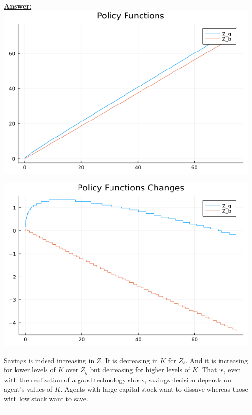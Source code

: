 \documentclass{article} %
\theoremstyle{definition}
\newenvironment{solution}[1][Answer]{\begin{singlespace}\underline{\textbf{#1:}}\quad }{\ \rule{0.3em}{0.3em}\end{singlespace}} %
\begin{document}
\begin{enumerate}
\begin{solution}
		\includegraphics[width=\linewidth]{02_Policy_Functions.png}
		
		\includegraphics[width=\linewidth]{02_Policy_Functions_Changes.png}
		
		Savings is indeed increasing in $ Z $. It is decreasing in $ K $ for $ Z_b $. And it is increasing for lower levels of $ K $ over $ Z_g $   but decreasing for higher levels of $ K $. That is, even with the realization of a good technology shock, savings decision depends on agent's values of $ K $. Agents with large capital stock want to dissave whereas those with low stock want to save.
	\end{solution}
\end{enumerate}
\end{document}
